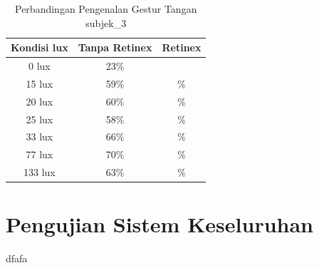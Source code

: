\begin{table}[H]
	\caption{Perbandingan Pengenalan Gestur Tangan subjek\_3}
	\vspace{0cm}
	\centering
	\begin{tabular}{|c|c|c|}
		\hline Kondisi lux &  Tanpa Retinex &Retinex \\
		\hline 0 lux &23\% &\\
		\hline 15 lux &59\% & \% \\
		\hline 20 lux &60\% &\% \\
		\hline 25 lux &58\% &\% \\
		\hline 33 lux &66\% &\% \\
		\hline 77 lux &70\% &\% \\
		\hline  133 lux& 63\% & \% \\
		\hline
	\end{tabular}
\end{table}

\section{Pengujian Sistem Keseluruhan}
dfafa